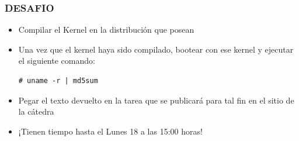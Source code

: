 \begin{frame}[fragile]
\frametitle{DESAFIO}
   \begin{itemize}  
   \item Compilar el Kernel en la distribución que posean
   \item Una vez que el kernel haya sido compilado, bootear con ese kernel y ejecutar el siguiente comando:
   \begin{lstlisting}
# uname -r | md5sum
    \end{lstlisting}
    \item Pegar el texto devuelto en la tarea que se publicará para tal fin en el sitio de la cátedra
    \item ¡Tienen tiempo hasta el Lunes 18 a las 15:00 horas!
 \end{itemize}
\end{frame}

